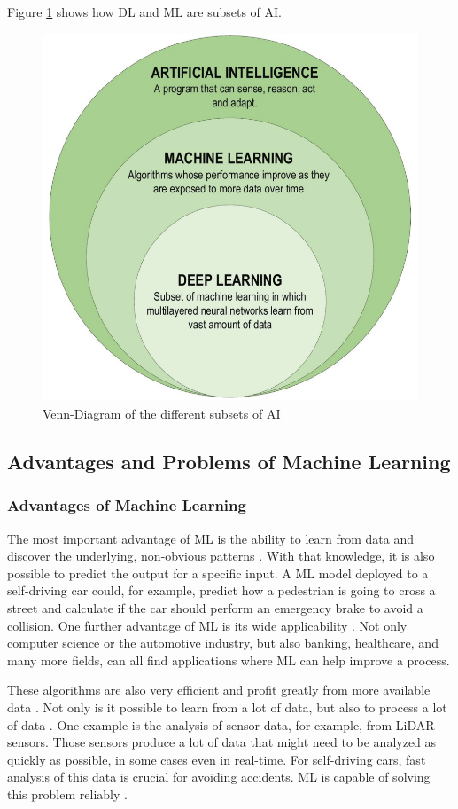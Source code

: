 Figure \ref{fig:AIMLDL} shows how DL and ML are subsets of AI. 

\begin{figure}[H]
	\centering
	\includegraphics[width=0.7\linewidth]{IMGs/AIMLDL.png}
	\caption{Venn-Diagram of the different subsets of AI \cite{Alzubaidi}}
	\label{fig:AIMLDL}
\end{figure}


\subsection{Advantages and Problems of Machine Learning}\label{Advantages and Problems of Machine Learning}
\subsubsection*{Advantages of Machine Learning}
The most important advantage of ML is the ability to learn from data and discover the underlying, non-obvious patterns \cite{Wuest}. With that knowledge, it is also possible to predict the output for a specific input. A ML model deployed to a self-driving car could, for example, predict how a pedestrian is going to cross a street and calculate if the car should perform an emergency brake to avoid a collision. One further advantage of ML is its wide applicability \cite{Thommandru}. Not only computer science or the automotive industry, but also banking, healthcare, and many more fields, can all find applications where ML can help improve a process.

These algorithms are also very efficient and profit greatly from more available data \cite{Janiesch}. Not only is it possible to learn from a lot of data, but also to process a lot of data \cite{Wuest}. One example is the analysis of sensor data, for example, from LiDAR sensors. Those sensors produce a lot of data that might need to be analyzed as quickly as possible, in some cases even in real-time. For self-driving cars, fast analysis of this data is crucial for avoiding accidents. ML is capable of solving this problem reliably \cite{Lyu}. 

